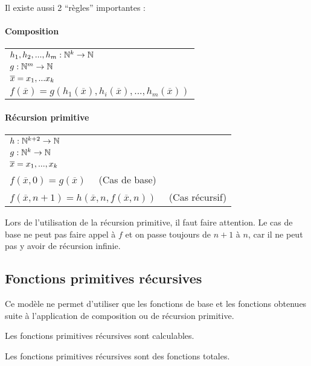 Il existe aussi 2 ``règles'' importantes :
\paragraph{Composition}
\begin{tabular}{|l|}
	\hline
	$h_1, h_2,...,h_m: \mathbb{N}^k \rightarrow \mathbb{N}$\\
	$g: \mathbb{N}^m \rightarrow \mathbb{N}$\\
	$\overline{x} =x_1,...x_k$ \\
	$f(\overline{x}) =
	g(h_1(\overline{x}),h_i(\overline{x}),...,h_m(\overline{x}))$\\
	\hline
\end{tabular}

\paragraph{Récursion primitive}
\begin{tabular}{|l|}
	\hline
	$h: \mathbb{N}^{k+2} \rightarrow \mathbb{N}$\\
	$g: \mathbb{N}^k \rightarrow \mathbb{N}$\\
	$\overline{x} =x_1,...,x_k$ \\
	$f(\overline{x}, 0) = g(\overline{x}) \quad$ (Cas de base)\\
	$f(\overline{x}, n+1) =
	h(\overline{x},n, f(\overline{x}, n))\quad$ (Cas récursif)\\
	\hline
\end{tabular}

\begin{myrem}
	Lors de l'utilisation de la récursion primitive, il faut faire
	attention. Le cas de base ne peut pas faire appel à $f$ et on passe
	toujours de $n+1$ à $n$, car il ne peut pas y avoir de récursion infinie.
\end{myrem}

\subsection{Fonctions primitives récursives}
Ce modèle ne permet d'utiliser que les fonctions de base et les fonctions
obtenues suite à l'application de composition ou de récursion primitive.

\begin{myprop}
	Les fonctions primitives récursives sont calculables.
\end{myprop}

\begin{myprop}
	Les fonctions primitives récursives sont des fonctions totales.
\end{myprop}

